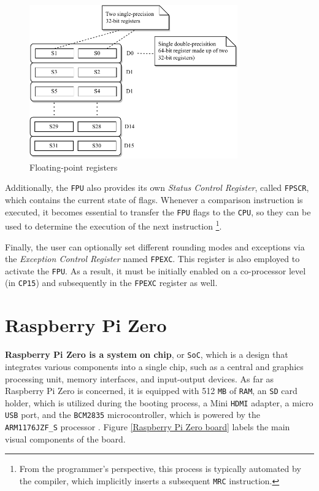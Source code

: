 \documentclass[english, ing, kiv, he, iso690numb, pdf]{fasthesis}
\begin{document}
	\begin{figure}[ht]
		\centering
		\includegraphics[width=0.8\textwidth]{img/diagrams/fpu_registers.pdf}
		\caption{Floating-point registers}
		\label{Floating-point registers}
	\end{figure}
	
	Additionally, the \texttt{FPU} also provides its own \textit{Status Control Register}, called \texttt{FPSCR}, which contains the current state of flags. Whenever a comparison instruction is executed, it becomes essential to transfer the \texttt{FPU} flags to the \texttt{CPU}, so they can be used to determine the execution of the next instruction \footnote{From the programmer's perspective, this process is typically automated by the compiler, which implicitly inserts a subsequent \texttt{MRC} instruction.}.
	
	Finally, the user can optionally set different rounding modes and exceptions via the \textit{Exception Control Register} named \texttt{FPEXC}. This register is also employed to activate the \texttt{FPU}. As a result, it must be initially enabled on a co-processor level (in \texttt{CP15}) and subsequently in the \texttt{FPEXC} register as well.
	
	\chapter{Raspberry Pi Zero}
	
	\textbf{Raspberry Pi Zero is a system on chip}, or \texttt{SoC}, which is a design that integrates various components into a single chip, such as a central and graphics processing unit, memory interfaces, and input-output devices. As far as Raspberry Pi Zero is concerned, it is equipped with 512 \texttt{MB} of \texttt{RAM}, an \texttt{SD} card holder, which is utilized during the booting process, a Mini \texttt{HDMI} adapter, a micro \texttt{USB} port, and the \texttt{BCM2835} microcontroller, which is powered by the \texttt{ARM1176JZF\_S} processor \cite{ARM1176JZF-S}. Figure \ref{Raspberry Pi Zero board} labels the main visual components of the board.
	
\end{document}
